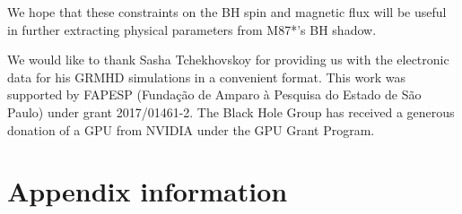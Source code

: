\documentclass[twocolumn, linenumbers]{aastex62} %
\begin{document}
We hope that these constraints on the BH spin and magnetic flux will be useful in further extracting physical parameters from M87*'s BH shadow.




\acknowledgments

We would like to thank Sasha Tchekhovskoy for providing us with the electronic data for his GRMHD simulations in a convenient format. 
This work was supported by FAPESP (Funda\c{c}\~ao de Amparo \`a Pesquisa do Estado de S\~ao Paulo) under grant 2017/01461-2. The Black Hole Group has received a generous donation of a GPU from NVIDIA under the GPU Grant Program.

\vspace{5mm}



\appendix

\section{Appendix information}






\end{document}
